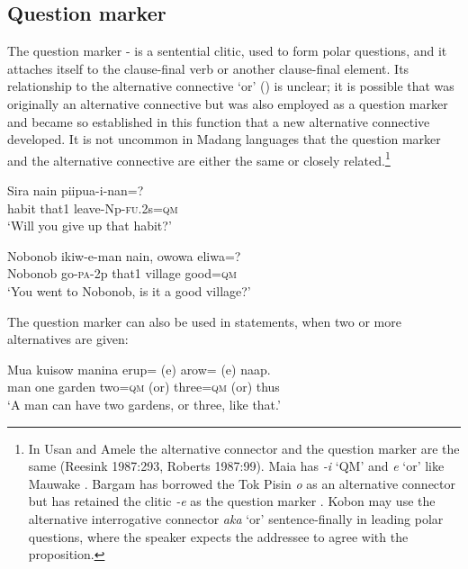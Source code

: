 \subsection{Question marker}
{}
The question marker - is a sentential clitic, used to form polar questions, and it attaches itself to the clause-final verb or another clause-final element. Its relationship to the alternative connective  `or' () is unclear; it is possible that  was originally an alternative connective but was also employed as a question marker and became so established in this function that a new alternative connective  developed. It is not uncommon in  Madang languages that the question marker and the alternative connective are either the same or closely related.\footnote{In Usan and Amele the alternative connector and the question marker are the same (Reesink 1987:293, Roberts 1987:99). Maia has \textit{-i} `QM' and \textit{e} `or' like Mauwake \citep[83,159]{Hardin2002}. Bargam has borrowed the Tok Pisin \textit{o} as an alternative connector but has retained the clitic \textit{-e} as the question marker \citep[53,122]{Hepner2002}. Kobon may use the alternative interrogative connector \textit{aka} `or' sentence-finally in leading polar questions, where the speaker expects the addressee to agree with the proposition. } 

\ea%
\label{ex:x789}
\gll Sira nain piipua-i-nan=? \\
habit that1 leave-Np-\textsc{fu}.2s=\textsc{qm}\\
\glt`Will you give up that habit?'
\z

\ea%
\label{ex:x790}
\gll Nobonob ikiw-e-man nain, owowa eliwa=? \\
Nobonob go-\textsc{pa}-2p that1 village good=\textsc{qm}\\
\glt`You went to Nobonob, is it a good village?'
\z

The question marker can also be used in statements, when two or more alternatives are given:

\ea%
\label{ex:x791}
\gll Mua kuisow manina erup= (e) arow= (e) naap. \\
man one garden two=\textsc{qm} (or) three=\textsc{qm} (or) thus\\
\glt`A man can have two gardens, or three, like that.'
\z

